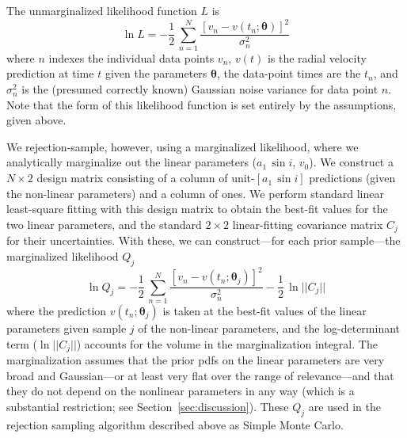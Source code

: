 \documentclass[manuscript, letterpaper]{aastex6}
\newcommand{\sectionname}{Section}
\newcommand{\asini}{\ensuremath{a_1\,\sin i}}
\newcommand{\bs}[1]{\boldsymbol{#1}}
\begin{document}
The unmarginalized likelihood function $L$ is
\begin{equation}
\ln L = -\frac{1}{2}\,\sum_{n=1}^N \frac{[v_n - v(t_n;\bs{\theta})]^2}{\sigma_n^2}
\end{equation}
where $n$ indexes the individual data points $v_n$, $v(t)$ is the
radial velocity prediction at time $t$ given the parameters $\bs{\theta}$, the
data-point times are the $t_n$, and $\sigma_n^2$ is the (presumed
correctly known) Gaussian noise variance for data point $n$.
Note that the form of this likelihood function is set entirely by
the assumptions, given above.

We rejection-sample, however, using a marginalized likelihood, where
we analytically marginalize out the linear parameters ($\asini$,
$v_0$).
We construct a $N\times 2$ design matrix consisting of a column of
unit-$[\asini]$ predictions (given the non-linear parameters) and a
column of ones.
We perform standard linear least-square fitting with this design
matrix to obtain the best-fit values for the two linear parameters,
and the standard $2\times 2$ linear-fitting covariance matrix $C_j$ for their
uncertainties.
With these, we can construct---for each prior sample---the marginalized
likelihood $Q_j$
\begin{equation}
\ln Q_j = -\frac{1}{2}\,\sum_{n=1}^N \frac{[v_n - v(t_n;\bs{\theta}_j)]^2}{\sigma_n^2} -\frac{1}{2}\,\ln ||C_j||
\end{equation}
where the prediction $v(t_n;\bs{\theta}_j)$ is taken at the best-fit values of
the linear parameters given sample $j$ of the non-linear parameters, and the
log-determinant term ($\ln ||C_j||$) accounts for the volume in the
marginalization integral.
The marginalization assumes that the prior pdfs on the linear parameters
are very broad and Gaussian---or
at least very flat over the range of relevance---and that they do not depend
on the nonlinear parameters in any way (which is a substantial restriction;
see \sectionname~\ref{sec:discussion}).
These $Q_j$ are used in the rejection sampling algorithm described above
as Simple Monte Carlo.
\end{document}
